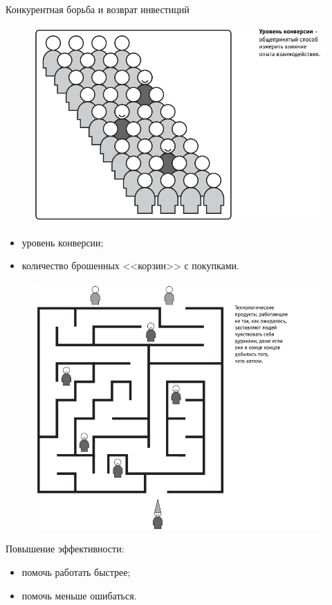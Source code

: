 \documentclass{beamer}
\begin{document}
\begin{frame}{Конкурентная борьба и возврат инвестиций}
\begin{figure}[h]
\centering
\includegraphics[scale=0.4]{images/lec01-pic02.png}
\end{figure}
\begin{itemize}
\item уровень конверсии; 
\item количество брошенных <<корзин>> с покупками.
\end{itemize}
\end{frame}

\begin{frame}
\begin{figure}[h]
\centering
\includegraphics[scale=0.4]{images/lec01-pic03.png}
\end{figure}
Повышение эффективности:
\begin{itemize}
\item помочь работать быстрее;
\item помочь меньше ошибаться.
\end{itemize}
\end{frame}
\end{document}

